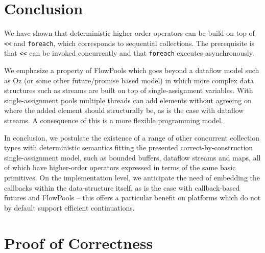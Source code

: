 \documentclass[runningheads,a4paper]{llncs}
\begin{document}
\section{Conclusion}

We have shown that deterministic higher-order operators can be build
on top of \verb=<<= and \verb=foreach=, which corresponds to
sequential collections.
The prerequisite is that \verb=<<= can be invoked concurrently and
that \verb=foreach= executes asynchronously.

We emphasize a property of FlowPools which goes beyond
a dataflow model such as Oz (or some other future/promise based
model) in which more complex data structures such as streams are built
on top of single-assignment variables.
With single-assignment pools multiple threads can add elements without
agreeing on where the added element should structurally be, as is the
case with dataflow streams.
A consequence of this is a more flexible programming model.

In conclusion, we postulate the existence of a range of other
concurrent collection types with deterministic semantics fitting the
presented correct-by-construction single-assignment model, such as
bounded buffers, dataflow streams and maps, all of which have
higher-order operators expressed in terms of the same basic
primitives.
On the implementation level, we anticipate the need of embedding the
callbacks within the data-structure itself, as is the case with
callback-based futures and FlowPools -- this offers a particular
benefit on platforms which do not by default support efficient
continuations.






\appendix
\let\oldsec\section
\renewcommand{\section}[1]{\clearpage \oldsec{#1}}
\section{Proof of Correctness}


\setcounter{lemma}{0}
\setcounter{theorem}{0}
\setcounter{corollary}{0}
\setcounter{definition}{0}
\end{document}
